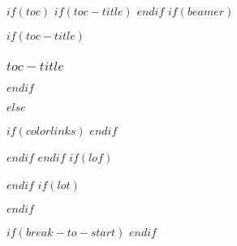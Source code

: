 $if(toc)$
$if(toc-title)$
\renewcommand*\contentsname{$toc-title$}
$endif$
$if(beamer)$
\begin{frame}[allowframebreaks]
$if(toc-title)$
  \frametitle{$toc-title$}
$endif$
  \tableofcontents[hideallsubsections]
\end{frame}
$else$
{
$if(colorlinks)$
\hypersetup{linkcolor=$if(toccolor)$$toccolor$$else$$endif$}
$endif$
\setcounter{tocdepth}{$toc-depth$}
\begin{center}
\tableofcontents
\end{center}
}
$endif$
$endif$
$if(lof)$
\begin{center}
\listoffigures
\end{center}
$endif$
$if(lot)$
\begin{center}
\listoftables
\end{center}
$endif$

$if(break-to-start)$
\newpage
$endif$
